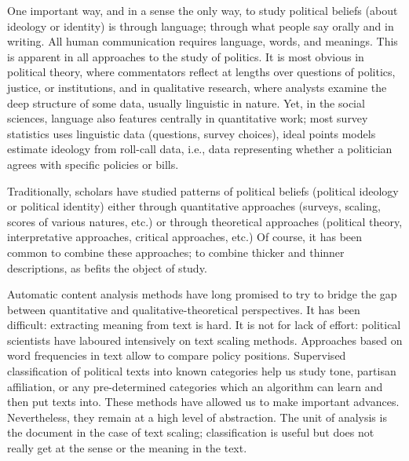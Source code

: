 \documentclass[
  openany]{book}
\begin{document}
One important way, and in a sense the only way, to study political beliefs (about ideology or identity) is through language; through what people say orally and in writing. All human communication requires language, words, and meanings. This is apparent in all approaches to the study of politics. It is most obvious in political theory, where commentators reflect at lengths over questions of politics, justice, or institutions, and in qualitative research, where analysts examine the deep structure of some data, usually linguistic in nature. Yet, in the social sciences, language also features centrally in quantitative work; most survey statistics uses linguistic data (questions, survey choices), ideal points models estimate ideology from roll-call data, i.e., data representing whether a politician agrees with specific policies or bills.

Traditionally, scholars have studied patterns of political beliefs (political ideology or political identity) either through quantitative approaches (surveys, scaling, scores of various natures, etc.) or through theoretical approaches (political theory, interpretative approaches, critical approaches, etc.) Of course, it has been common to combine these approaches; to combine thicker and thinner descriptions, as befits the object of study.

Automatic content analysis methods have long promised to try to bridge the gap between quantitative and qualitative-theoretical perspectives. It has been difficult: extracting meaning from text is hard. It is not for lack of effort: political scientists have laboured intensively on text scaling methods. Approaches based on word frequencies in text \citep[\citet{laver2003extracting}]{slapin2008scaling} allow to compare policy positions. Supervised classification of political texts into known categories help us study tone, partisan affiliation, or any pre-determined categories which an algorithm can learn and then put texts into. These methods have allowed us to make important advances. Nevertheless, they remain at a high level of abstraction. The unit of analysis is the document in the case of text scaling; classification is useful but does not really get at the sense or the meaning in the text.
\end{document}
